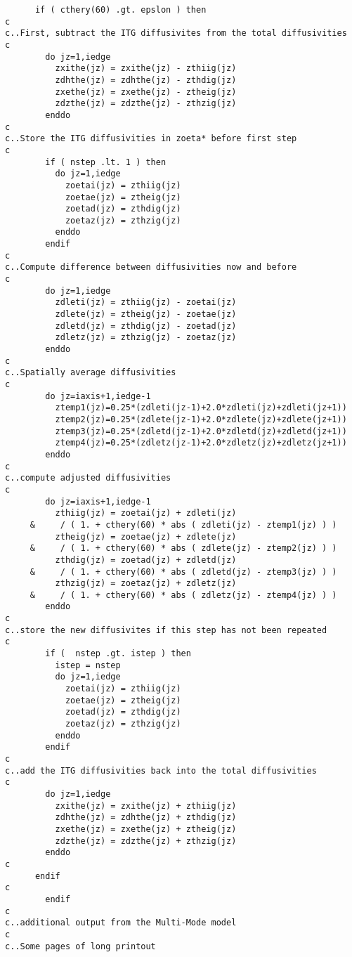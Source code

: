 \begin{verbatim}
      if ( cthery(60) .gt. epslon ) then
c
c..First, subtract the ITG diffusivites from the total diffusivities
c
        do jz=1,iedge
          zxithe(jz) = zxithe(jz) - zthiig(jz)
          zdhthe(jz) = zdhthe(jz) - zthdig(jz) 
          zxethe(jz) = zxethe(jz) - ztheig(jz)
          zdzthe(jz) = zdzthe(jz) - zthzig(jz)
        enddo
c
c..Store the ITG diffusivities in zoeta* before first step
c
        if ( nstep .lt. 1 ) then
          do jz=1,iedge
            zoetai(jz) = zthiig(jz)
            zoetae(jz) = ztheig(jz)
            zoetad(jz) = zthdig(jz)
            zoetaz(jz) = zthzig(jz)
          enddo
        endif
c
c..Compute difference between diffusivities now and before
c
        do jz=1,iedge
          zdleti(jz) = zthiig(jz) - zoetai(jz)
          zdlete(jz) = ztheig(jz) - zoetae(jz)
          zdletd(jz) = zthdig(jz) - zoetad(jz)
          zdletz(jz) = zthzig(jz) - zoetaz(jz)
        enddo
c
c..Spatially average diffusivities
c
        do jz=iaxis+1,iedge-1
          ztemp1(jz)=0.25*(zdleti(jz-1)+2.0*zdleti(jz)+zdleti(jz+1))
          ztemp2(jz)=0.25*(zdlete(jz-1)+2.0*zdlete(jz)+zdlete(jz+1))
          ztemp3(jz)=0.25*(zdletd(jz-1)+2.0*zdletd(jz)+zdletd(jz+1))
          ztemp4(jz)=0.25*(zdletz(jz-1)+2.0*zdletz(jz)+zdletz(jz+1))
        enddo
c
c..compute adjusted diffusivities
c
        do jz=iaxis+1,iedge-1
          zthiig(jz) = zoetai(jz) + zdleti(jz)
     &     / ( 1. + cthery(60) * abs ( zdleti(jz) - ztemp1(jz) ) )
          ztheig(jz) = zoetae(jz) + zdlete(jz)
     &     / ( 1. + cthery(60) * abs ( zdlete(jz) - ztemp2(jz) ) )
          zthdig(jz) = zoetad(jz) + zdletd(jz)
     &     / ( 1. + cthery(60) * abs ( zdletd(jz) - ztemp3(jz) ) )
          zthzig(jz) = zoetaz(jz) + zdletz(jz)
     &     / ( 1. + cthery(60) * abs ( zdletz(jz) - ztemp4(jz) ) )
        enddo
c
c..store the new diffusivites if this step has not been repeated
c
        if (  nstep .gt. istep ) then
          istep = nstep
          do jz=1,iedge
            zoetai(jz) = zthiig(jz)
            zoetae(jz) = ztheig(jz)
            zoetad(jz) = zthdig(jz)
            zoetaz(jz) = zthzig(jz)
          enddo
        endif
c
c..add the ITG diffusivities back into the total diffusivities
c
        do jz=1,iedge
          zxithe(jz) = zxithe(jz) + zthiig(jz)
          zdhthe(jz) = zdhthe(jz) + zthdig(jz) 
          zxethe(jz) = zxethe(jz) + ztheig(jz)
          zdzthe(jz) = zdzthe(jz) + zthzig(jz)
        enddo
c
      endif
c
        endif
c
c..additional output from the Multi-Mode model
c
c..Some pages of long printout

\end{verbatim}
